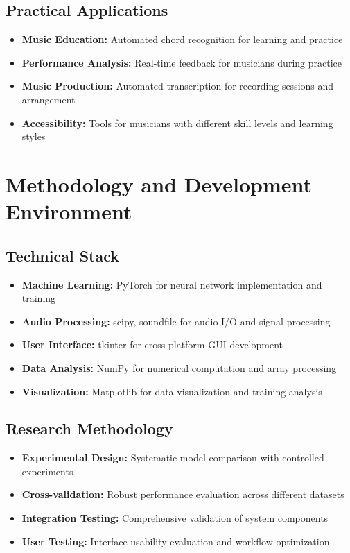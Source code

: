\documentclass[11pt]{article}
\begin{document}
\subsection*{Practical Applications}
\begin{itemize}[leftmargin=*,itemsep=2pt]
  \item \textbf{Music Education:} Automated chord recognition for learning and practice
  \item \textbf{Performance Analysis:} Real-time feedback for musicians during practice
  \item \textbf{Music Production:} Automated transcription for recording sessions and arrangement
  \item \textbf{Accessibility:} Tools for musicians with different skill levels and learning styles
\end{itemize}

\section*{Methodology and Development Environment}

\subsection*{Technical Stack}
\begin{itemize}[leftmargin=*,itemsep=2pt]
  \item \textbf{Machine Learning:} PyTorch for neural network implementation and training
  \item \textbf{Audio Processing:} scipy, soundfile for audio I/O and signal processing
  \item \textbf{User Interface:} tkinter for cross-platform GUI development
  \item \textbf{Data Analysis:} NumPy for numerical computation and array processing
  \item \textbf{Visualization:} Matplotlib for data visualization and training analysis
\end{itemize}

\subsection*{Research Methodology}
\begin{itemize}[leftmargin=*,itemsep=2pt]
  \item \textbf{Experimental Design:} Systematic model comparison with controlled experiments
  \item \textbf{Cross-validation:} Robust performance evaluation across different datasets
  \item \textbf{Integration Testing:} Comprehensive validation of system components
  \item \textbf{User Testing:} Interface usability evaluation and workflow optimization
\end{itemize}
\end{document}
